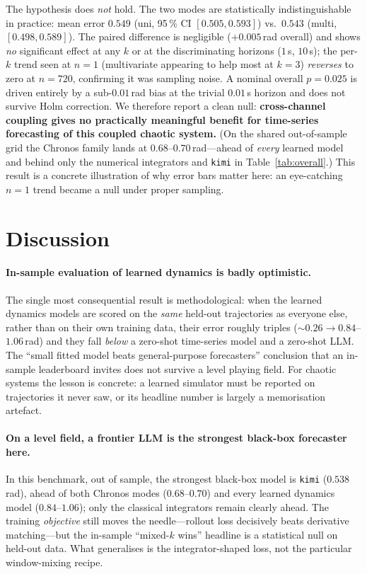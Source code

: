 \documentclass{article}
\begin{document}
The hypothesis does \emph{not} hold. The two modes are statistically
indistinguishable in practice: mean error $0.549$ (uni, 95\,\% CI $[0.505,0.593]$)
vs.\ $0.543$ (multi, $[0.498,0.589]$). The paired difference is negligible
($+0.005$\,rad overall) and shows \emph{no} significant effect at any $k$ or at the
discriminating horizons ($1$\,s, $10$\,s); the per-$k$ trend seen at $n{=}1$
(multivariate appearing to help most at $k{=}3$) \emph{reverses} to zero at
$n{=}720$, confirming it was sampling noise. A nominal overall $p{=}0.025$ is driven
entirely by a sub-$0.01$\,rad bias at the trivial $0.01$\,s horizon and does not
survive Holm correction. We therefore report a clean null: \textbf{cross-channel
coupling gives no practically meaningful benefit for time-series forecasting of this
coupled chaotic system.} (On the shared out-of-sample grid the Chronos family lands
at $0.68$--$0.70$\,rad---ahead of \emph{every} learned model and behind only the
numerical integrators and \texttt{kimi} in Table~\ref{tab:overall}.) This result is a
concrete illustration of why error bars matter here: an eye-catching $n{=}1$ trend
became a null under proper sampling.

\section{Discussion}

\paragraph{In-sample evaluation of learned dynamics is badly optimistic.} The single
most consequential result is methodological: when the learned dynamics models are
scored on the \emph{same} held-out trajectories as everyone else, rather than on
their own training data, their error roughly triples (${\sim}0.26\to0.84$--$1.06$\,rad)
and they fall \emph{below} a zero-shot time-series model and a zero-shot LLM. The
``small fitted model beats general-purpose forecasters'' conclusion that an in-sample
leaderboard invites does not survive a level playing field. For chaotic systems the
lesson is concrete: a learned simulator must be reported on trajectories it never saw,
or its headline number is largely a memorisation artefact.

\paragraph{On a level field, a frontier LLM is the strongest black-box forecaster here.}
In this benchmark, out of sample, the strongest black-box model is \texttt{kimi}
($0.538$\,rad), ahead of both
Chronos modes ($0.68$--$0.70$) and every learned dynamics model ($0.84$--$1.06$); only
the classical integrators remain clearly ahead. The training \emph{objective} still
moves the needle---rollout loss decisively beats derivative matching---but the
in-sample ``mixed-$k$ wins'' headline is a statistical null on held-out data. What
generalises is the integrator-shaped loss, not the particular window-mixing recipe.
\end{document}
